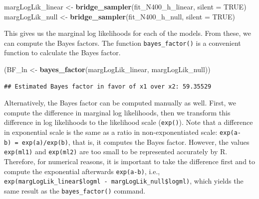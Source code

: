 \documentclass[12pt,]{krantz}
\newenvironment{Shaded}{\begin{snugshade}}{\end{snugshade}}
\newcommand{\KeywordTok}[1]{\textcolor[rgb]{0.13,0.29,0.53}{\textbf{#1}}}
\newcommand{\DataTypeTok}[1]{\textcolor[rgb]{0.13,0.29,0.53}{#1}}
\newcommand{\StringTok}[1]{\textcolor[rgb]{0.31,0.60,0.02}{#1}}
\newcommand{\OtherTok}[1]{\textcolor[rgb]{0.56,0.35,0.01}{#1}}
\newcommand{\OperatorTok}[1]{\textcolor[rgb]{0.81,0.36,0.00}{\textbf{#1}}}
\newcommand{\NormalTok}[1]{#1}
\theoremstyle{definition}
\theoremstyle{definition}
\theoremstyle{definition}
\theoremstyle{remark}
\begin{document}
\begin{Shaded}
\begin{Highlighting}[]
\NormalTok{margLogLik_linear <-}\StringTok{ }\KeywordTok{bridge_sampler}\NormalTok{(fit_N400_h_linear, }\DataTypeTok{silent =} \OtherTok{TRUE}\NormalTok{)}
\NormalTok{margLogLik_null   <-}\StringTok{ }\KeywordTok{bridge_sampler}\NormalTok{(fit_N400_h_null, }\DataTypeTok{silent =} \OtherTok{TRUE}\NormalTok{)}
\end{Highlighting}
\end{Shaded}

This gives us the marginal log likelihoods for each of the models. From
these, we can compute the Bayes factors. The function
\texttt{bayes\_factor()} is a convenient function to calculate the Bayes
factor.

\begin{Shaded}
\begin{Highlighting}[]
\NormalTok{(BF_ln <-}\StringTok{ }\KeywordTok{bayes_factor}\NormalTok{(margLogLik_linear, margLogLik_null))}
\end{Highlighting}
\end{Shaded}

\begin{verbatim}
## Estimated Bayes factor in favor of x1 over x2: 59.35529
\end{verbatim}

Alternatively, the Bayes factor can be computed manually as well. First,
we compute the difference in marginal log likelihoods, then we transform
this difference in log likelihoods to the likelihood scale
(\texttt{exp()}). Note that a difference in exponential scale is the
same as a ratio in non-exponentiated scale:
\texttt{exp(a-b)\ =\ exp(a)/exp(b)}, that is, it computes the Bayes
factor. However, the values \texttt{exp(ml1)} and \texttt{exp(ml2)} are
too small to be represented accurately by R. Therefore, for numerical
reasons, it is important to take the difference first and to compute the
exponential afterwards \texttt{exp(a-b)}, i.e.,
\texttt{exp(margLogLik\_linear\$logml\ -\ margLogLik\_null\$logml)},
which yields the same result as the \texttt{bayes\_factor()} command.

\begin{Shaded}
\end{Shaded}
\end{document}
